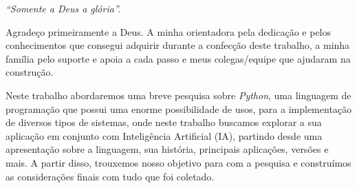 \begin{flushright}
{\it ``Somente a Deus a gl\'oria''.}
\end{flushright}


\pagebreak



\vspace{1.5cm}

Agradeço primeiramente a Deus. A minha orientadora pela dedicação e pelos conhecimentos que consegui adquirir durante a confecção deste trabalho, a minha família pelo suporte e apoia a cada passo e meus colegas/equipe que ajudaram na construção.

\vspace{0.5cm}

\newpage


\vspace{1.5cm}

Neste trabalho abordaremos uma breve pesquisa sobre \textit{Python}, uma linguagem de programação que possui uma enorme possibilidade de usos, para a implementação de diversos tipos de sistemas, onde neste trabalho buscamos explorar a sua aplicação em conjunto com Inteligência Artificial (IA), partindo desde uma apresentação sobre a linguagem, sua história, principais aplicações, versões e mais. A partir disso, trouxemos nosso objetivo para com a pesquisa e construímos as considerações finais com tudo que foi coletado.

\vspace{0.5cm}


\pagebreak

\thispagestyle{empty}





